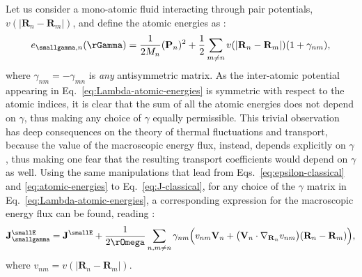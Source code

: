 Let us consider a mono-atomic fluid interacting through pair potentials, $v(|\mathbf{R}_n-\mathbf{R}_m|)$, and define the atomic energies as \citep{Marcolongo2014,Ercole2016}:
\begin{equation}
  e_{\smallgamma,n}(\rGamma) =
  \frac{1}{2M_n}(\mathbf{P}_{n})^{2} + \frac{1}{2}\sum_{m\ne n}
  v(|\mathbf{R}_{n}-\mathbf{R}_{m}|)
  (1+\gamma_{nm}), \label{eq:Lambda-atomic-energies}
\end{equation}
where $\gamma_{nm}=-\gamma_{mn}$ is \emph{any} antisymmetric matrix.
As the inter-atomic potential appearing in Eq.~\eqref{eq:Lambda-atomic-energies} is symmetric with respect to the atomic indices, it is clear that the sum of all the atomic energies does not depend on $\gamma$, thus making any choice of $\gamma$ equally permissible. This trivial observation has deep consequences on the theory of thermal fluctuations and transport, because the value of the macroscopic energy flux, instead, depends explicitly on $\gamma$, thus making one fear that the resulting transport coefficients would depend on $\gamma$ as well. Using the same manipulations that lead from Eqs.~\eqref{eq:epsilon-classical} and \eqref{eq:atomic-energies} to Eq.~\eqref{eq:J-classical}, for any choice of the $\gamma$ matrix in Eq.~\eqref{eq:Lambda-atomic-energies}, a corresponding expression for the macroscopic energy flux can be found, reading \citep{Marcolongo2014,Ercole2016}:
\begin{equation}
  \mathbf{J}_{\smallgamma}^\smallE=\mathbf{J}^\smallE+
  \frac{1}{2 \rOmega}\sum_{n,m\ne n}\gamma_{nm} \Bigl ( v_{nm} \mathbf{V}_{n} + \bigl (\mathbf{V}_{n}\cdot \nabla_{\mathbf{R}_n} v_{nm} \bigr )  (\mathbf{R}_{n}-\mathbf{R}_{m}) \Bigr ), \label{eq:Lambda-classical-current}
\end{equation}
where $v_{nm}= v(|\mathbf{R}_{n} - \mathbf{R}_{m}|)$.

